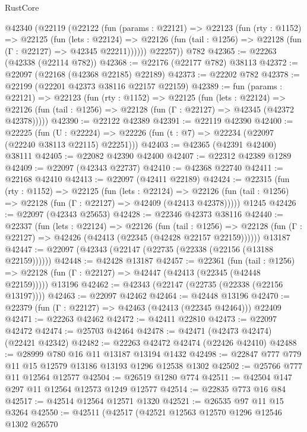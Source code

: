 \begin{lexlean}{RustCore}
\begin{coremodule}
    @42340
      (@22119
        (@22122
          (fun (params : @22121) =>
          @22123
            (fun (rty : @1152) =>
            @22125
              (fun (lets : @22124) =>
              @22126 (fun (tail : @1256) => @22128 (fun (Γ : @22127) => @42345 @22211))))))
        @22257))
    @782
@42365 := @22263 (@42338 (@22114 @782))
@42368 := @22176 (@22177 @782) @38113
@42372 := @22097 (@22168 (@42368 @22185) @22189)
@42373 := @22202 @782
@42378 := @22199 (@22201 @42373 @38116 @22157 @22159)
@42389 := fun (params : @22121) =>
  @22123
    (fun (rty : @1152) =>
    @22125
      (fun (lets : @22124) =>
      @22126 (fun (tail : @1256) => @22128 (fun (Γ : @22127) => @42345 (@42372 @42378)))))
@42390 := @22122 @42389
@42391 := @22119 @42390
@42400 := @22225
    (fun (U : @22224) => @22226 (fun (t : @7) => @22234 (@22097 (@22240 @38113 @22115) @22251)))
@42403 := @42365 (@42391 @42400) @38111
@42405 := @22082 @42390 @42400
@42407 := @22312 @42389 @1289
@42409 := @22097 (@42343 @22737)
@42410 := @42368 @22740
@42411 := @22168 @42410
@42413 := @22097 (@42411 @22189)
@42424 := @22315
    (fun (rty : @1152) =>
    @22125
      (fun (lets : @22124) =>
      @22126 (fun (tail : @1256) => @22128 (fun (Γ : @22127) => @42409 (@42413 @42378)))))
    @1245
@42426 := @22097 (@42343 @25653)
@42428 := @22346 @42373 @38116
@42440 := @22337
    (fun (lets : @22124) =>
    @22126
      (fun (tail : @1256) =>
      @22128 (fun (Γ : @22127) => @42426 (@42413 (@22345 (@42428 @22157 @22159))))))
    @13187
@42447 := @22097 (@42343 (@22147 (@22735 (@22338 (@22156 (@13188 @22159))))))
@42448 := @42428 @13187
@42457 := @22361
    (fun (tail : @1256) => @22128 (fun (Γ : @22127) => @42447 (@42413 (@22345 (@42448 @22159)))))
    @13196
@42462 := @42343 (@22147 (@22735 (@22338 (@22156 @13197))))
@42463 := @22097 @42462
@42464 := @42448 @13196
@42470 := @22379 (fun (Γ : @22127) => @42463 (@42413 (@22345 @42464))) @22409
@42471 := @22263 @42462
@42472 := @42411 @22810
@42473 := @22097 @42472
@42474 := @25703 @42464
@42478 := @42471 (@42473 @42474) (@22421 @42342)
@42482 := @22263 @42472 @42474 (@22426 @42410)
@42488 := @28999 @780 @16 @11 @13187 @13194 @1432
@42498 := @22847 @777 @779 @11 @15 @12579 @13186 @13193 @1296 @12538 @1302
@42502 := @25766 @777 @11 @12564 @12577
@42504 := @26519 @1280 @774
@42511 := @42504 @147 @297 @11 @12564 @12573 @1249 @12577
@42514 := @22835 @773 @16 @84
@42517 := @42514 @12564 @12571 @1320
@42521 := @26535 @97 @11 @15 @3264
@42550 := @42511
    (@42517
      (@42521
        @12563
        @12570
        @1296
        @12546
        @1302
        @26570

\end{coremodule}
\end{lexlean}
